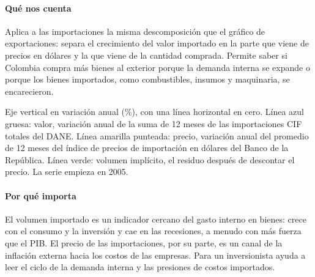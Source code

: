 \paragraph{Qué nos cuenta}
Aplica a las importaciones la misma descomposición que el gráfico de exportaciones: separa el crecimiento del valor importado en la parte que viene de precios en dólares y la que viene de la cantidad comprada. Permite saber si Colombia compra más bienes al exterior porque la demanda interna se expande o porque los bienes importados, como combustibles, insumos y maquinaria, se encarecieron.

\begin{leer}
Eje vertical en variación anual (\%), con una línea horizontal en cero. Línea azul gruesa: valor, variación anual de la suma de 12 meses de las importaciones CIF totales del DANE. Línea amarilla punteada: precio, variación anual del promedio de 12 meses del índice de precios de importación en dólares del Banco de la República. Línea verde: volumen implícito, el residuo después de descontar el precio. La serie empieza en 2005.
\end{leer}

\paragraph{Por qué importa}
El volumen importado es un indicador cercano del gasto interno en bienes: crece con el consumo y la inversión y cae en las recesiones, a menudo con más fuerza que el PIB. El precio de las importaciones, por su parte, es un canal de la inflación externa hacia los costos de las empresas. Para un inversionista ayuda a leer el ciclo de la demanda interna y las presiones de costos importados.

